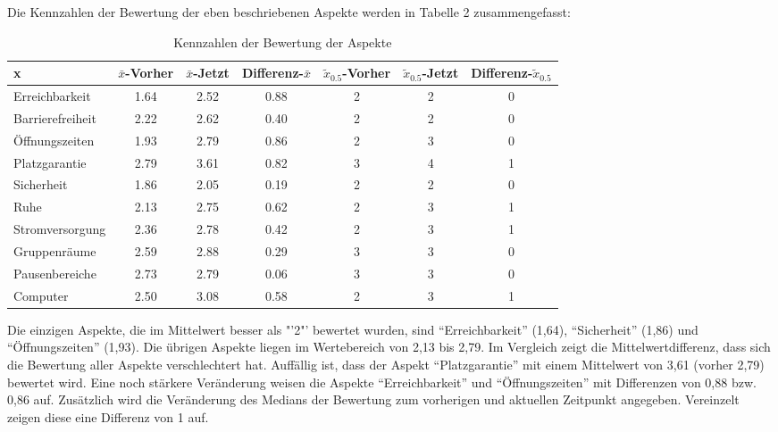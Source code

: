 \documentclass[11pt, a4paper]{article}
\begin{document}
Die Kennzahlen der Bewertung der eben beschriebenen Aspekte werden in Tabelle 2 zusammengefasst:
\begin{table}[h]
	\vspace*{0cm}
	\hspace*{0.48cm}
	\begin{tabular}{l|cccccc}
		x                & $\bar{x}$-Vorher & $\bar{x}$-Jetzt & Differenz-$\bar{x}$ & $\tilde{x}_{0.5}$-Vorher & $\tilde{x}_{0.5}$-Jetzt & Differenz-$\tilde{x}_{0.5}$\\ \hline
		Erreichbarkeit   & 1.64              & 2.52             & 0.88                 & 2             & 2            & 0                     \\
		Barrierefreiheit & 2.22              & 2.62             & 0.40                 & 2             & 2            & 0                     \\
		Öffnungszeiten   & 1.93              & 2.79             & 0.86                 & 2             & 3            & 0                     \\
		Platzgarantie    & 2.79              & 3.61             & 0.82                 & 3             & 4            & 1                     \\
		Sicherheit       & 1.86              & 2.05             & 0.19                 & 2             & 2            & 0                     \\
		Ruhe             & 2.13              & 2.75             & 0.62                 & 2             & 3            & 1                     \\
		Stromversorgung  & 2.36              & 2.78             & 0.42                 & 2             & 3            & 1                     \\
		Gruppenräume     & 2.59              & 2.88             & 0.29                 & 3             & 3            & \multicolumn{1}{c}{0} \\
		Pausenbereiche   & 2.73              & 2.79             & 0.06                 & 3             & 3            & 0                     \\
		Computer         & 2.50              & 3.08             & 0.58                 & 2             & 3            & 1                    
	\end{tabular}
			\caption{Kennzahlen der Bewertung der Aspekte}
\end{table}

Die einzigen Aspekte, die im Mittelwert besser als "'2"' bewertet wurden, sind “Erreichbarkeit” (1,64), “Sicherheit” (1,86) und “Öffnungszeiten” (1,93). Die übrigen Aspekte liegen im Wertebereich von 2,13 bis 2,79.
Im Vergleich zeigt die Mittelwertdifferenz, dass sich die Bewertung aller Aspekte verschlechtert hat. Auffällig ist, dass der Aspekt “Platzgarantie” mit einem Mittelwert von 3,61 (vorher 2,79) bewertet wird. Eine noch stärkere Veränderung weisen die Aspekte “Erreichbarkeit” und “Öffnungszeiten” mit Differenzen von 0,88 bzw. 0,86 auf.
Zusätzlich wird die Veränderung des Medians der Bewertung zum vorherigen und aktuellen Zeitpunkt angegeben. Vereinzelt zeigen diese eine Differenz von 1 auf.
\end{document}

